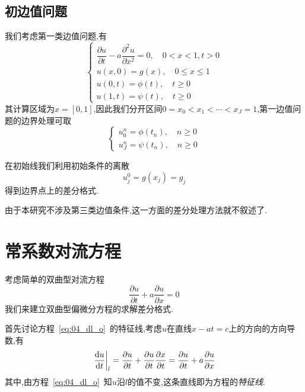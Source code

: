 \subsection{初边值问题}
我们考虑第一类边值问题,有
\begin{equation}
\begin{cases}
\dfrac{\partial u}{\partial t}-a\dfrac{\partial^2 u}{\partial x^2}=0,\quad 0<x<1,t>0 \\
u(x,0)=g(x),\quad 0\leq x\leq 1 \\
u(0,t)=\phi(t),\quad t\geq 0 \\
u(1,t)=\psi(t),\quad t\geq 0 
\end{cases}
\end{equation}
其计算区域为$x=[0,1]$,因此我们分开区间$0=x_0<x_1<\cdots<x_J=1$,第一边值问题的边界处理可取
\begin{equation}
\begin{cases}
u_0^n=\phi(t_n),\quad n\geq0 \\
u_J^n=\psi(t_n),\quad n\geq0
\end{cases}
\end{equation}\par
在初始线我们利用初始条件的离散
\begin{equation}
 u_j^0=g(x_j)=g_j
\end{equation}
得到边界点上的差分格式.\par
由于本研究不涉及第三类边值条件,这一方面的差分处理方法就不叙述了.
\section{常系数对流方程}
考虑简单的双曲型对流方程
\begin{equation}\label{eq:04_dl_o}
 \dfrac{\partial u}{\partial t}+a\dfrac{\partial u}{\partial x}=0
\end{equation}
我们来建立双曲型偏微分方程的求解差分格式.\par
首先讨论方程~\eqref{eq:04_dl_o}~的特征线,考虑$u$在直线$x-at=c$上的方向的方向导数,有
\begin{equation}
\left.\dfrac{\mathrm{d} u}{\mathrm{d} t}\right|_l = \dfrac{\partial u}{\partial t}+\dfrac{\partial u}{\partial t}
\dfrac{\partial x}{\partial t} = \dfrac{\partial u}{\partial t}+a\dfrac{\partial u}{\partial x}
\end{equation}
其中,由方程~\eqref{eq:04_dl_o}~知$u$沿$l$的值不变,这条直线即为方程的\emph{特征线}.\par
